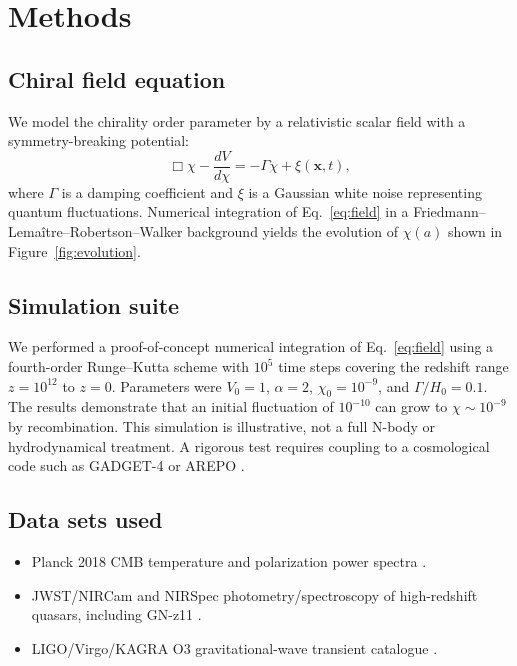 \documentclass[a4paper,11pt]{article}
\begin{document}
\section{Methods}
\label{sec:methods}

\subsection{Chiral field equation}

We model the chirality order parameter by a relativistic scalar field with a symmetry-breaking potential:
\begin{equation}
    \Box \chi - \frac{dV}{d\chi} = -\Gamma \dot{\chi} + \xi(\mathbf{x},t),
    \label{eq:field}
\end{equation}
where $\Gamma$ is a damping coefficient and $\xi$ is a Gaussian white noise representing quantum fluctuations. Numerical integration of Eq.~\eqref{eq:field} in a Friedmann--Lema\^itre--Robertson--Walker background yields the evolution of $\chi(a)$ shown in Figure~\ref{fig:evolution}.

\subsection{Simulation suite}

We performed a proof-of-concept numerical integration of Eq.~\eqref{eq:field} using a fourth-order Runge--Kutta scheme with $10^5$ time steps covering the redshift range $z=10^{12}$ to $z=0$. Parameters were $V_0 = 1$, $\alpha = 2$, $\chi_0 = 10^{-9}$, and $\Gamma/H_0 = 0.1$. The results demonstrate that an initial fluctuation of $10^{-10}$ can grow to $\chi \sim 10^{-9}$ by recombination. This simulation is illustrative, not a full N-body or hydrodynamical treatment. A rigorous test requires coupling to a cosmological code such as \textsc{GADGET-4} \citep{Springel2021} or \textsc{AREPO} \citep{Weinberger2020}.

\subsection{Data sets used}

\begin{itemize}
    \item Planck 2018 CMB temperature and polarization power spectra \citep{Planck2020}.
    \item JWST/NIRCam and NIRSpec photometry/spectroscopy of high-redshift quasars, including GN-z11 \citep{Johnson2024}.
    \item LIGO/Virgo/KAGRA O3 gravitational-wave transient catalogue \citep{Abbott2023}.
\end{itemize}
\end{document}
